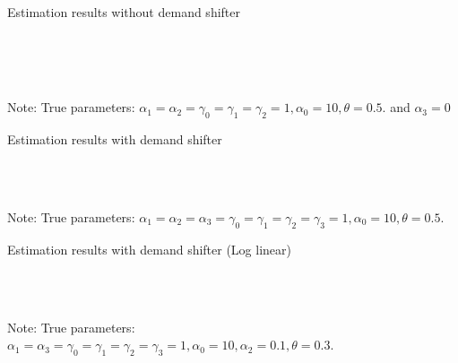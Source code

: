 \documentclass[11pt, a4paper]{article}
\begin{document}
\begin{table}[!htbp]
  \begin{center}
      \caption{Estimation results without demand shifter}
      \label{tb:linear_linear_sigma_1_without_demand_shifter_y} 
      \subfloat[$\sigma=0.001$]{}\\
      \subfloat[$\sigma=0.5$]{}\\
      \subfloat[$\sigma=1.0$]{}\\
    \subfloat[$\sigma=2.0$]{}
  \end{center}\footnotesize
  Note: True parameters: $\alpha_1 = \alpha_2 =  \gamma_0 = \gamma_1 = \gamma_2  =  1, \alpha_0 = 10, \theta = 0.5.$ and $\alpha_3 =0$
\end{table} 


\begin{table}[!htbp]
  \begin{center}
      \caption{Estimation results with demand shifter}
      \label{tb:linear_linear_sigma_1} 
      \subfloat[$\sigma=0.001$]{}\\
      \subfloat[$\sigma=0.5$]{}\\
    \subfloat[$\sigma=2.0$]{}
  \end{center}\footnotesize
  Note: True parameters: $\alpha_1 = \alpha_2 = \alpha_3 = \gamma_0 = \gamma_1 = \gamma_2  = \gamma_3 = 1, \alpha_0 = 10, \theta = 0.5.$
\end{table} 


\begin{table}[!htbp]
  \begin{center}
      \caption{Estimation results with demand shifter (Log linear)}
      \label{tb:loglinear_loglinear_sigma_1} 
      \subfloat[$\sigma=0.001$]{}\\
      \subfloat[$\sigma=0.5$]{}\\
    \subfloat[$\sigma=2.0$]{}
  \end{center}\footnotesize
  Note: True parameters: $\alpha_1 = \alpha_3 = \gamma_0 = \gamma_1 = \gamma_2  = \gamma_3 = 1, \alpha_0 = 10, \alpha_2 = 0.1,  \theta = 0.3.$
\end{table} 
\end{document}
